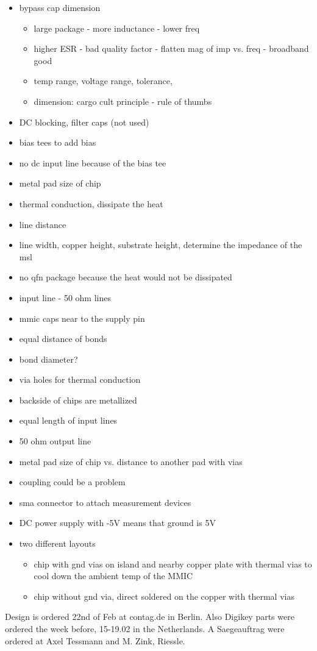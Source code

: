 \begin{itemize}
	\item bypass cap dimension
	\begin{itemize}
		\item large package - more inductance - lower freq
		\item higher ESR - bad quality factor - flatten mag of imp vs. freq - broadband good
		\item temp range, voltage range, tolerance, 
		\item dimension: cargo cult principle - rule of thumbs
	\end{itemize}
	\item DC blocking, filter caps (not used) 
	\item bias tees to add bias 
	\item no dc input line because of the bias tee
	\item metal pad size of chip
	\item thermal conduction, dissipate the heat
	\item line distance
	\item line width, copper height, substrate height, determine the impedance of the msl
	\item no qfn package because the heat would not be dissipated
	\item input line - 50 ohm lines
	\item mmic caps near to the supply pin
	\item equal distance of bonds
	\item bond diameter?
	\item via holes for thermal conduction
	\item backside of chips are metallized
	\item equal length of input lines
	\item 50 ohm output line
	\item metal pad size of chip vs. distance to another pad with vias
	\item coupling could be a problem
	\item sma connector to attach measurement devices
	\item DC power supply with -5V means that ground is 5V
	\item two different layouts
	\begin{itemize}
		\item chip with gnd vias on island and nearby copper plate with thermal vias to cool down the ambient temp of the MMIC
		\item chip without gnd via, direct soldered on the copper with thermal vias
	\end{itemize}
\end{itemize}

Design is ordered 22nd of Feb at contag.de in Berlin.
Also Digikey parts were ordered the week before, 15-19.02 in the Netherlands. A Saegeauftrag were ordered at Axel Tessmann and M. Zink, Riessle. 